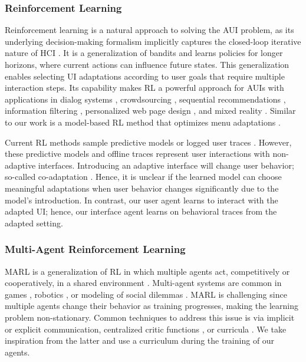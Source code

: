 \subsubsection{Reinforcement Learning} 
Reinforcement learning is a natural approach to solving the AUI problem, as its underlying decision-making formalism implicitly
captures the closed-loop iterative nature of HCI \cite{howes2018interaction}. 
It is a generalization of bandits and learns policies for longer horizons, where current actions can influence future states.
This generalization enables selecting UI adaptations according to user goals that require multiple interaction steps.
Its capability makes RL a powerful approach for AUIs with applications in dialog systems \cite{Gasic2014, Su2017}, crowdsourcing \cite{PengCrowdsourcing2013, Hu2018}, sequential recommendations \cite{Chen2019, Liu2018, Liebman2015}, information filtering \cite{seo2000reinforcement}, personalized web page design \cite{ferretti2014exploiting}, and mixed reality \cite{gebhardt2019learning}.
Similar to our work is a model-based RL method that optimizes menu adaptations \cite{todi2021adapting}.

Current RL methods sample predictive models \cite{todi2021adapting, Gasic2014, Hu2018} or logged user traces  \cite{gebhardt2019learning}. However, these predictive models and offline traces represent user interactions with non-adaptive interfaces. Introducing an adaptive interface will change user behavior; so-called co-adaptation \cite{mackay2000responding}. Hence, it is unclear if the learned model can choose meaningful adaptations when user behavior changes significantly due to the model's introduction. In contrast, our user agent learns to interact with the adapted UI; hence, our interface agent learns on behavioral traces from the adapted setting.

\subsubsection{Multi-Agent Reinforcement Learning}
MARL is a generalization of RL in which multiple agents act, competitively or cooperatively, in a shared environment \cite{zhang2021multi}.  
%
Multi-agent systems are common in games \cite{baker2019emergent, jaderberg2019quake}, robotics \cite{ota2006multiagent,sariff2018multiagent}, or modeling of social dilemmas \cite{chao2015social,leibo2017multi}. MARL is challenging since multiple agents change their behavior as training progresses, making the learning problem non-stationary. Common techniques to address this issue is via implicit \cite{tian2020implicit} or explicit \cite{foerster2016learning} communication, centralized critic functions \cite{lowe2017multi,yu2021surprising}, or curricula \cite{epciclr2020,wang2020curriculum}. We take inspiration from the latter and use a curriculum during the training of our agents.

